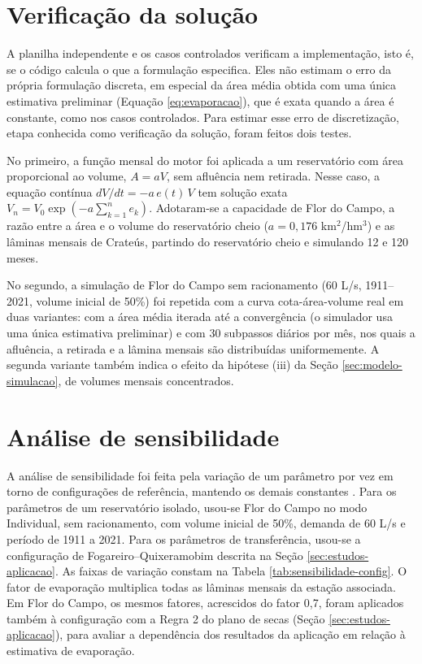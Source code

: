 \section{Verificação da solução}
\label{sec:metodo-solucao}

A planilha independente e os casos controlados verificam a implementação, isto é, se o código calcula o que a formulação especifica. Eles não estimam o erro da própria formulação discreta, em especial da área média obtida com uma única estimativa preliminar (Equação \ref{eq:evaporacao}), que é exata quando a área é constante, como nos casos controlados. Para estimar esse erro de discretização, etapa conhecida como verificação da solução, foram feitos dois testes.

No primeiro, a função mensal do motor foi aplicada a um reservatório com área proporcional ao volume, $A = aV$, sem afluência nem retirada. Nesse caso, a equação contínua $dV/dt = -a\,e(t)\,V$ tem solução exata $V_n = V_0 \exp\left(-a \sum_{k=1}^{n} e_k\right)$. Adotaram-se a capacidade de Flor do Campo, a razão entre a área e o volume do reservatório cheio ($a = 0{,}176$ km$^2$/hm$^3$) e as lâminas mensais de Crateús, partindo do reservatório cheio e simulando 12 e 120 meses.

No segundo, a simulação de Flor do Campo sem racionamento (60 L/s, 1911--2021, volume inicial de 50\%) foi repetida com a curva cota-área-volume real em duas variantes: com a área média iterada até a convergência (o simulador usa uma única estimativa preliminar) e com 30 subpassos diários por mês, nos quais a afluência, a retirada e a lâmina mensais são distribuídas uniformemente. A segunda variante também indica o efeito da hipótese (iii) da Seção \ref{sec:modelo-simulacao}, de volumes mensais concentrados.

\section{Análise de sensibilidade}
\label{sec:metodo-sensibilidade}

A análise de sensibilidade foi feita pela variação de um parâmetro por vez em torno de configurações de referência, mantendo os demais constantes \cite{pianosi2016}. Para os parâmetros de um reservatório isolado, usou-se Flor do Campo no modo Individual, sem racionamento, com volume inicial de 50\%, demanda de 60 L/s e período de 1911 a 2021. Para os parâmetros de transferência, usou-se a configuração de Fogareiro--Quixeramobim descrita na Seção \ref{sec:estudos-aplicacao}. As faixas de variação constam na Tabela \ref{tab:sensibilidade-config}. O fator de evaporação multiplica todas as lâminas mensais da estação associada. Em Flor do Campo, os mesmos fatores, acrescidos do fator 0,7, foram aplicados também à configuração com a Regra 2 do plano de secas (Seção \ref{sec:estudos-aplicacao}), para avaliar a dependência dos resultados da aplicação em relação à estimativa de evaporação.


